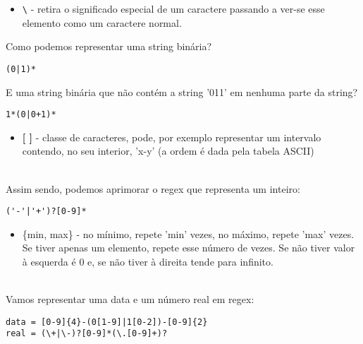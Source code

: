 \documentclass{article}
\begin{document}
\begin{itemize}
\item \texttt{\textbackslash} - retira o significado especial de um caractere passando a ver-se esse elemento como um caractere normal.
\end{itemize}
 Como podemos representar uma string binária?\\
 \begin{verbatim}
(0|1)*
\end{verbatim}
 E uma string binária que não contém a string '011' em nenhuma parte da string?\\
 \begin{verbatim}
1*(0|0+1)*
\end{verbatim}
 
\begin{itemize}
\item \textbf{[ ]} - classe de caracteres, pode, por exemplo representar um intervalo contendo, no seu interior, 'x-y' (a ordem é dada pela tabela ASCII)
\end{itemize}
\\
 Assim sendo, podemos aprimorar o regex que representa um inteiro:\\
 \begin{verbatim}
('-'|'+')?[0-9]*
\end{verbatim}
 
\begin{itemize}
\item \{min, max\} - no mínimo, repete 'min' vezes, no máximo, repete 'max' vezes. Se tiver apenas um elemento, repete esse número de vezes. Se não tiver valor à esquerda é 0 e, se não tiver à direita tende para infinito.
\end{itemize}
\\
 Vamos representar uma data e um número real em regex:\\
 \begin{verbatim}
data = [0-9]{4}-(0[1-9]|1[0-2])-[0-9]{2}
real = (\+|\-)?[0-9]*(\.[0-9]+)?
\end{verbatim}
\end{document}
